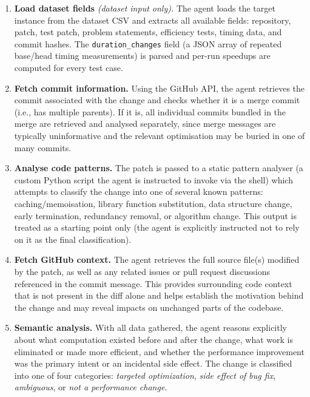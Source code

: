 \documentclass[12pt, a4paper]{article}
\begin{document}
\begin{enumerate}

    \item \textbf{Load dataset fields} \textit{(dataset input only).} The agent loads the target instance from the dataset CSV and extracts all available fields: repository, patch, test patch, problem statements, efficiency tests, timing data, and commit hashes. The \texttt{duration\_changes} field (a JSON array of repeated base/head timing measurements) is parsed and per-run speedups are computed for every test case.

    \item \textbf{Fetch commit information.} Using the GitHub API, the agent retrieves the commit associated with the change and checks whether it is a merge commit (i.e., has multiple parents). If it is, all individual commits bundled in the merge are retrieved and analysed separately, since merge messages are typically uninformative and the relevant optimisation may be buried in one of many commits.

    \item \textbf{Analyse code patterns.} The patch is passed to a static pattern analyser (a custom Python script the agent is instructed to invoke via the shell) which attempts to classify the change into one of several known patterns: caching/memoisation, library function substitution, data structure change, early termination, redundancy removal, or algorithm change. This output is treated as a starting point only (the agent is explicitly instructed not to rely on it as the final classification).

    \item \textbf{Fetch GitHub context.} The agent retrieves the full source file(s) modified by the patch, as well as any related issues or pull request discussions referenced in the commit message. This provides surrounding code context that is not present in the diff alone and helps establish the motivation behind the change and may reveal impacts on unchanged parts of the codebase.

    \item \textbf{Semantic analysis.} With all data gathered, the agent reasons explicitly about what computation existed before and after the change, what work is eliminated or made more efficient, and whether the performance improvement was the primary intent or an incidental side effect. The change is classified into one of four categories: \textit{targeted optimization}, \textit{side effect of bug fix}, \textit{ambiguous}, or \textit{not a performance change}.

\end{enumerate}
\end{document}
